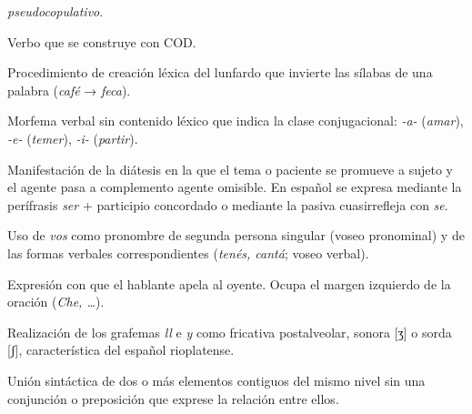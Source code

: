 \begin{glosariogeneral}
        \textit{pseudocopulativo}.
  \item[Verbo transitivo:] Verbo que se construye con COD.
  \item[Vesre:] Procedimiento de creación léxica del lunfardo que invierte las
        sílabas de una palabra (\textit{café} → \textit{feca}).
  \item[Vocal temática:] Morfema verbal sin contenido léxico que indica la
        clase conjugacional: \textit{-a-} (\textit{amar}), \textit{-e-}
        (\textit{temer}), \textit{-i-} (\textit{partir}).
  \item[Voz pasiva:] Manifestación de la diátesis en la que el tema o paciente
        se promueve a sujeto y el agente pasa a complemento agente omisible. En
        español se expresa mediante la perífrasis \textit{ser} + participio
        concordado o mediante la pasiva cuasirrefleja con \textit{se}.
  \item[Voseo:] Uso de \textit{vos} como pronombre de segunda persona singular
        (voseo pronominal) y de las formas verbales correspondientes
        (\textit{tenés, cantá}; voseo verbal).
  \item[Vocativo:] Expresión con que el hablante apela al oyente. Ocupa el
        margen izquierdo de la oración (\textit{Che, \ldots}).
  \item[Yeísmo rehilado:] Realización de los grafemas \textit{ll} e \textit{y}
        como fricativa postalveolar, sonora [ʒ] o sorda [ʃ], característica del
        español rioplatense.
  \item[Yuxtaposición:] Unión sintáctica de dos o más elementos contiguos del
        mismo nivel sin una conjunción o preposición que exprese la relación entre
        ellos.
\end{glosariogeneral}

